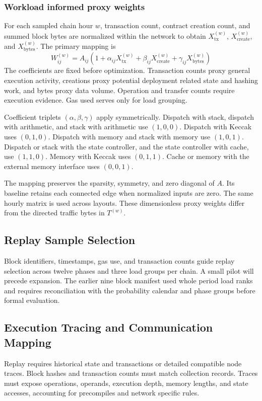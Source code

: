 \documentclass[runningheads]{llncs}
\begin{document}
\subsubsection{Workload informed proxy weights}
For each sampled chain hour $w$, transaction count, contract creation count, and summed block bytes are normalized within the network to obtain $X_{\mathrm{tx}}^{(w)}$, $X_{\mathrm{create}}^{(w)}$, and $X_{\mathrm{bytes}}^{(w)}$. The primary mapping is
\begin{equation}
W_{ij}^{(w)}=A_{ij}\left(1+\alpha_{ij}X_{\mathrm{tx}}^{(w)}+\beta_{ij}X_{\mathrm{create}}^{(w)}+\gamma_{ij}X_{\mathrm{bytes}}^{(w)}\right)\label{eq:proxy}
\end{equation}
The coefficients are fixed before optimization. Transaction counts proxy general execution activity, creations proxy potential deployment related state and hashing work, and bytes proxy data volume. Operation and transfer counts require execution evidence. Gas used serves only for load grouping.

Coefficient triplets $(\alpha,\beta,\gamma)$ apply symmetrically. Dispatch with stack, dispatch with arithmetic, and stack with arithmetic use $(1,0,0)$. Dispatch with Keccak uses $(0,1,0)$. Dispatch with memory and stack with memory use $(1,0,1)$. Dispatch or stack with the state controller, and the state controller with cache, use $(1,1,0)$. Memory with Keccak uses $(0,1,1)$. Cache or memory with the external memory interface uses $(0,0,1)$.

The mapping preserves the sparsity, symmetry, and zero diagonal of $A$. Its baseline retains each connected edge when normalized inputs are zero. The same hourly matrix is used across layouts. These dimensionless proxy weights differ from the directed traffic bytes in $T^{(w)}$.

\subsection{Replay Sample Selection}
Block identifiers, timestamps, gas use, and transaction counts guide replay selection across twelve phases and three load groups per chain. A small pilot will precede expansion. The earlier nine block manifest used whole period load ranks and requires reconciliation with the probability calendar and phase groups before formal evaluation.

\subsection{Execution Tracing and Communication Mapping}
Replay requires historical state and transactions or detailed compatible node traces. Block hashes and transaction counts must match collection records. Traces must expose operations, operands, execution depth, memory lengths, and state accesses, accounting for precompiles and network specific rules.
\end{document}
